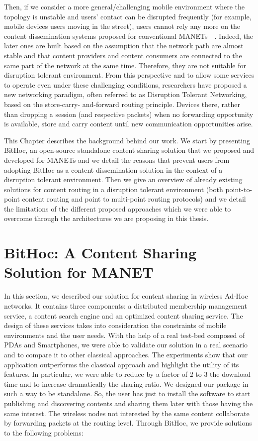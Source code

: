 Then, if we consider a more general/challenging mobile environment where the topology is unstable and users' contact can be disrupted frequently (for example, mobile devices users moving in the street), users cannot rely any more on the content dissemination systems proposed for conventional MANETs~\cite{BitHoc}~\cite{BlueTorrent}. Indeed, the later ones are built based on the assumption that the network path are almost stable and that content providers and content consumers are connected to the same part of the network at the same time. Therefore, they are not suitable for disruption tolerant environment. From this perspective and to allow some services to operate even under
these challenging conditions, researchers have proposed a new networking paradigm, often referred to as Disruption Tolerant Networking, based on the store-carry-
and-forward routing principle. Devices there, rather than dropping a session (and respective packets) when no forwarding opportunity is available, store and carry
content until new communication opportunities arise. 

This Chapter describes the background behind our work. We start by presenting BitHoc, an open-source standalone content sharing solution that we proposed and developed for MANETs and we detail the reasons that prevent users from adopting BitHoc as a content dissemination solution in the context of a disruption tolerant environment. Then we give an overview of already existing solutions for content routing in a disruption tolerant environment (both point-to-point content routing and point to multi-point routing protocols) and we detail the limitations of the different proposed approaches which we were able to overcome through the architectures we are proposing in this thesis.

\section{BitHoc: A Content Sharing Solution for MANET}

In this section, we described our solution for content sharing in wireless Ad-Hoc networks. It contains three components: a distributed membership management service, a content search engine and an optimized content sharing service. The design of these services takes into consideration the constraints of mobile environments and the user needs. With the help of a real test-bed composed of PDAs and Smartphones, we were able to validate our solution in a real scenario and to compare it to other classical approaches. The experiments show that our application outperforms the classical approach and highlight the utility of its features. In particular, we were able to reduce by a factor of $2$ to $3$ the download time and to increase dramatically the sharing ratio. We designed our package in such a way to be standalone. So, the user has just to install the software to start publishing and discovering contents and sharing them later with those having the same interest. The wireless nodes not interested by the same content collaborate by forwarding packets at the routing level. Through BitHoc, we provide solutions to the following problems:

